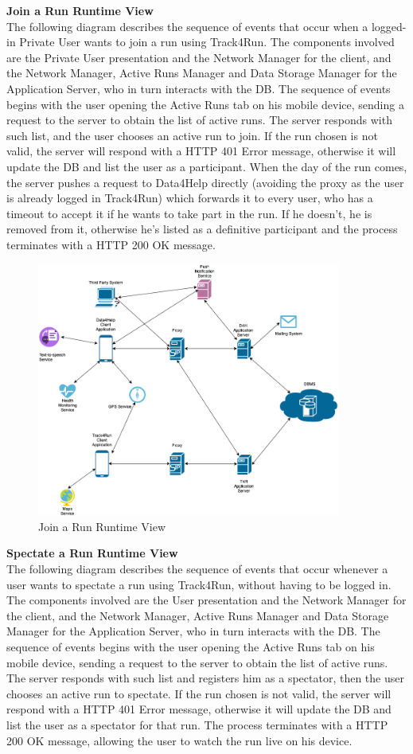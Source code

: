 \documentclass[titlepage]{article}
\begin{document}
{\bf Join a Run Runtime View }\\ 
The following diagram describes the sequence of events that occur when a logged-in Private User wants to join a run using Track4Run.
The components involved are the Private User presentation and the Network Manager for the client, and the Network Manager, Active Runs Manager and Data Storage Manager for the Application Server, who in turn interacts with the DB.
The sequence of events begins with the user opening the Active Runs tab on his mobile device, sending a request to the server to obtain the list of active runs. The server responds with such list, and the user chooses an active run to join. If the run chosen is not valid, the server will respond with a HTTP 401 Error message, otherwise it will update the DB and list the user as a participant.
When the day of the run comes, the server pushes a request to Data4Help directly (avoiding the proxy as the user is already logged in Track4Run) which forwards it to every user, who has a timeout to accept it if he wants to take part in the run. If he doesn’t, he is removed from it, otherwise he’s listed as a definitive participant and the process terminates with a HTTP 200 OK message.

\begin{figure}[H]
	\center
  	\includegraphics[width=10cm]{Overview.png} %
  	\caption{Join a Run Runtime View}
 	\label{fig:JOIN}
\end{figure}


{\bf Spectate a Run Runtime View }\\ 
The following diagram describes the sequence of events that occur whenever a user wants to spectate a run using Track4Run, without having to be logged in.
The components involved are the User presentation and the Network Manager for the client, and the Network Manager, Active Runs Manager and Data Storage Manager for the Application Server, who in turn interacts with the DB.
The sequence of events begins with the user opening the Active Runs tab on his mobile device, sending a request to the server to obtain the list of active runs. The server responds with such list and registers him as a spectator, then the user chooses an active run to spectate. If the run chosen is not valid, the server will respond with a HTTP 401 Error message, otherwise it will update the DB and list the user as a spectator for that run. The process terminates with a HTTP 200 OK message, allowing the user to watch the run live on his device.
\end{document}
